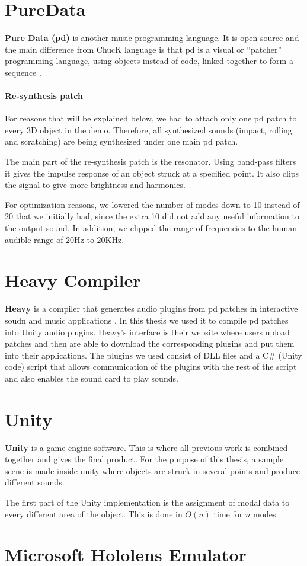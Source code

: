 \section{PureData}
\textbf{Pure Data (pd)} is another music programming language. It is open source and the main difference from ChucK language is that pd is a visual or ``patcher'' programming language, using objects instead of code, linked together to form a sequence \cite{bib:pd}.

\paragraph{Re-synthesis patch\\}
For reasons that will be explained below, we had to attach only one pd patch to every 3D object in the demo. Therefore, all synthesized sounds (impact, rolling and scratching) are being synthesized under one main pd patch. 

The main part of the re-synthesis patch is the resonator. Using band-pass filters it gives the impulse response of an object struck at a specified point. It also clips the signal to give more brightness and harmonics. 

For optimization reasons, we lowered the number of modes down to 10 instead of 20 that we initially had, since the extra 10 did not add any useful information to the output sound. In addition, we clipped the range of frequencies to the human audible range of 20Hz to 20KHz. 

\section{Heavy Compiler}
\textbf{Heavy} is a compiler that generates audio plugins from pd patches in interactive soudn and music applications \cite{bib:heavy}. In this thesis we used it to compile pd patches into Unity audio plugins. Heavy's interface is their website where users upload patches and then are able to download the corresponding plugins and put them into their applications. The plugins we used consist of DLL files and a C\# (Unity code) script that allows communication of the plugins with the rest of the script and also enables the sound card to play sounds.

\section{Unity\textregistered}
\textbf{Unity\textregistered} is a game engine software. This is where all previous work is combined together and gives the final product. For the purpose of this thesis, a sample scene is made inside unity where objects are struck in several points and produce different sounds. 

The first part of the Unity implementation is the assignment of modal data to every different area of the object. This is done in $O(n)$ time for $n$ modes. 


\section{Microsoft Hololens Emulator}

